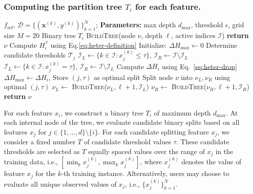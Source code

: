 \subsubsection{Computing the partition tree $T_i$ for each feature.}
\label{subsec:partition-tree}

\begin{algorithm}[tb]
\caption{Fitting a Partition Tree $T_i$ for Feature $x_i$}
\label{alg:fit-tree}
\begin{algorithmic}[1]
    $f_{\text{ref}}$, $\mathcal{D} = \{(\mathbf{x}^{(k)}, y^{(k)})\}_{k=1}^N$; {\bfseries Parameters:} max depth $d_{\max}$, threshold $\epsilon$, grid size $M=20$
    Binary tree $T_i$
   \STATE
    \textsc{BuildTree}(node $\nu$, depth $\ell$, active indices $\mathcal{I}$)
      \STATE \textbf{return} $\nu$ 
   \ENDIF
   \STATE Compute $H_i^{\mathcal{I}}$ using Eq.\eqref{eq:heter-definition}
   \STATE Initialize: $\Delta H_{\max} \leftarrow 0$
      \STATE Determine candidate thresholds $\mathcal{T}_j$ 
            \STATE $\mathcal{I}_L \leftarrow \{k \in \mathcal{I} : x_j^{(k)} \leq \tau\}$, $\mathcal{I}_R \leftarrow \mathcal{I} \setminus \mathcal{I}_L$
        \ELSE[$x_j$ is categorical]
            \STATE $\mathcal{I}_L \leftarrow \{k \in \mathcal{I} : x_j^{(k)} = \tau\}$, $\mathcal{I}_R \leftarrow \mathcal{I} \setminus \mathcal{I}_L$
        \ENDIF
         \STATE Compute $\Delta H_i$ using Eq.~\eqref{eq:heter-drop}
            \STATE $\Delta H_{\max} \leftarrow \Delta H_i$, Store $(j, \tau) $ as optimal split
         \ENDIF
      \ENDFOR
   \ENDFOR
      \STATE Split node $\nu$ into $\nu_L, \nu_R$ using optimal $(j, \tau)$
      \STATE $\nu_L \leftarrow$ \textsc{BuildTree}($\nu_L, \ell + 1, \mathcal{I}_L$)
      \STATE $\nu_R \leftarrow$ \textsc{BuildTree}($\nu_R, \ell + 1, \mathcal{I}_R$)
   \ENDIF
   \STATE \textbf{return} $\nu$
\end{algorithmic}
\end{algorithm}

For each feature \(x_i\), we construct a binary tree \(T_i\) of maximum depth \(d_{\max}\).
At each internal node of the tree, we evaluate candidate binary splits based on all features \(x_j\) for \(j \in \{1, \ldots, d\} \setminus \{i\}\).
For each candidate splitting feature \(x_j\), we consider a fixed number \(T\) of candidate threshold values \(\tau\).
These candidate thresholds are selected as \(T\) equally spaced values over the range of \(x_j\) in the training data, i.e., \([\min_k x_j^{(k)}, \max_k x_j^{(k)}]\), where \(x_j^{(k)}\) denotes the value of feature \(x_j\) for the \(k\)-th training instance.  
Alternatively, users may choose to evaluate all unique observed values of $x_j$, i.e., \(\{x_j^{(k)}\}_{k=1}^N\).

